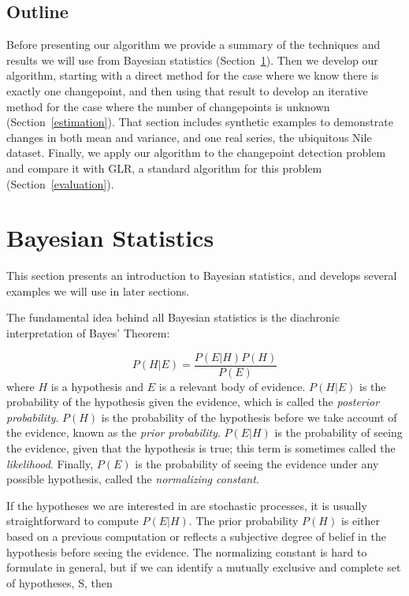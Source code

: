 \documentclass[twocolumn,11pt]{article}
\begin{document}
\subsection{Outline}

Before presenting our algorithm we provide a summary of the techniques
and results we will use from Bayesian statistics
(Section~\ref{bayes}).  Then we develop our algorithm, starting with a
direct method for the case where we know there is exactly one
changepoint, and then using that result to develop an iterative method
for the case where the number of changepoints is unknown
(Section~\ref{estimation}).  That section includes synthetic examples
to demonstrate changes in both mean and variance, and one real series,
the ubiquitous Nile dataset.  Finally, we apply our algorithm to the
changepoint detection problem and compare it with GLR, a standard
algorithm for this problem (Section~\ref{evaluation}).




\section{Bayesian Statistics}
\label{bayes}

This section presents an introduction to Bayesian statistics, and
develops several examples we will use in later sections.

The fundamental idea behind all Bayesian statistics is the
diachronic interpretation of Bayes' Theorem:

\begin{equation}
P(H|E) = \frac{P(E|H) P(H)}{P(E)}
\label{bayeseq}
\end{equation}
%
where $H$ is a hypothesis and $E$ is a relevant body of evidence.
$P(H|E)$ is the probability of the hypothesis given the evidence,
which is called the {\em posterior probability}.  $P(H)$ is the
probability of the hypothesis before we take account of the
evidence, known as the {\em prior probability}.  $P(E|H)$ is the
probability of seeing the evidence, given that the hypothesis
is true; this term is sometimes called the {\em likelihood}.
Finally, $P(E)$ is the probability of seeing the evidence under
any possible hypothesis, called the {\em normalizing constant}.

If the hypotheses we are interested in are stochastic
processes, it is usually straightforward to compute $P(E|H)$.  The
prior probability $P(H)$ is either based on a previous computation or
reflects a subjective degree of belief in the hypothesis before seeing
the evidence.  The normalizing constant is hard to formulate in general,
but if we can identify a mutually exclusive and complete set of
hypotheses, S, then
\end{document}
